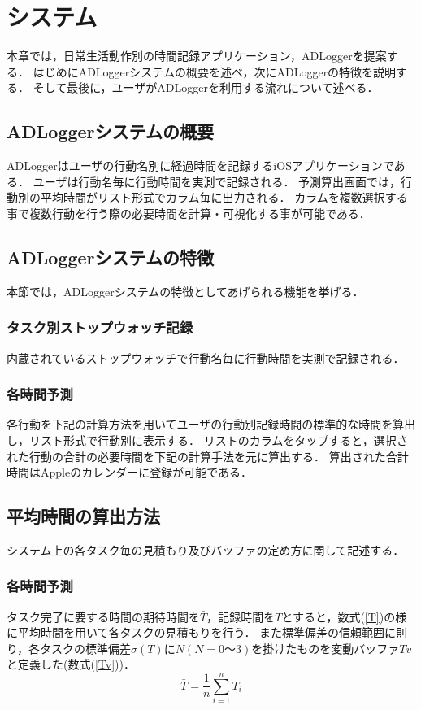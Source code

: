 \chapter{システム}
本章では，日常生活動作別の時間記録アプリケーション，ADLoggerを提案する．
はじめにADLoggerシステムの概要を述べ，次にADLoggerの特徴を説明する．
そして最後に，ユーザがADLoggerを利用する流れについて述べる．

\section{ADLoggerシステムの概要}
ADLoggerはユーザの行動名別に経過時間を記録するiOSアプリケーションである．
ユーザは行動名毎に行動時間を実測で記録される．
予測算出画面では，行動別の平均時間がリスト形式でカラム毎に出力される．
カラムを複数選択する事で複数行動を行う際の必要時間を計算・可視化する事が可能である．

\section{ADLoggerシステムの特徴}
本節では，ADLoggerシステムの特徴としてあげられる機能を挙げる．

\subsection{タスク別ストップウォッチ記録}
内蔵されているストップウォッチで行動名毎に行動時間を実測で記録される．

\subsection{各時間予測}
各行動を下記の計算方法を用いてユーザの行動別記録時間の標準的な時間を算出し，リスト形式で行動別に表示する．
リストのカラムをタップすると，選択された行動の合計の必要時間を下記の計算手法を元に算出する．
算出された合計時間はAppleのカレンダーに登録が可能である．


\section{平均時間の算出方法}
システム上の各タスク毎の見積もり及びバッファの定め方に関して記述する．
\subsection{各時間予測}
タスク完了に要する時間の期待時間を$\bar{T}$，記録時間を$T$とすると，数式(\ref{T})の様に平均時間を用いて各タスクの見積もりを行う．
また標準偏差の信頼範囲に則り，各タスクの標準偏差$\sigma (T)$に$N (N=0〜3)$を掛けたものを変動バッファ$Tv$と定義した(数式(\ref{Tv}))．
\begin{equation}
\label{T}
\bar{T}=\frac{1}{n}\displaystyle\sum_{i=1}^{n}T_{i}
\end{equation}

